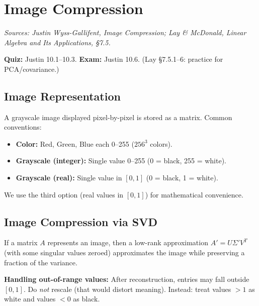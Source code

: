 \chapter{Image Compression}

\noindent\textit{Sources: Justin Wyss-Gallifent, \textit{Image Compression}; Lay \& McDonald, \textit{Linear Algebra and Its Applications}, \S7.5.}

\begin{remark}
\textbf{Quiz:} Justin 10.1--10.3. \textbf{Exam:} Justin 10.6. (Lay \S7.5.1--6: practice for PCA/covariance.)
\end{remark}

\section{Image Representation}

A grayscale image displayed pixel-by-pixel is stored as a matrix. Common conventions:
\begin{itemize}
  \item \textbf{Color:} Red, Green, Blue each 0--255 ($256^3$ colors).
  \item \textbf{Grayscale (integer):} Single value 0--255 (0 = black, 255 = white).
  \item \textbf{Grayscale (real):} Single value in $[0,1]$ (0 = black, 1 = white).
\end{itemize}

We use the third option (real values in $[0,1]$) for mathematical convenience.

\section{Image Compression via SVD}

If a matrix $A$ represents an image, then a low-rank approximation $A'=U\Sigma'V^T$ (with some singular values zeroed) approximates the image while preserving a fraction of the variance.

\textbf{Handling out-of-range values:} After reconstruction, entries may fall outside $[0,1]$. Do \emph{not} rescale (that would distort meaning). Instead: treat values $>1$ as white and values $<0$ as black.

